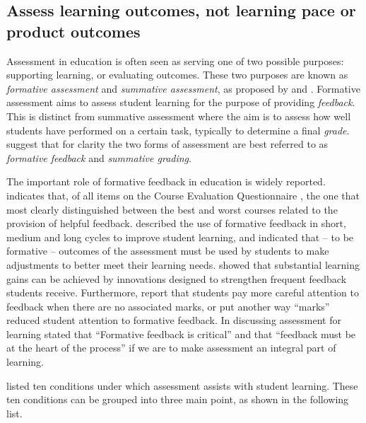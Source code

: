 

\subsection{Assess learning outcomes, not learning pace or product outcomes} %
\label{ssub:aim_to_assess_learning_outcomes_not_learning_pace_or_product_outcomes_}

Assessment in education is often seen as serving one of two possible purposes: supporting learning, or evaluating outcomes. These two purposes are known as \emph{formative assessment} and \emph{summative assessment}, as proposed by \citet{Scriven:1967} and \citet{Bloom:1969}. Formative assessment aims to assess student learning for the purpose of providing \emph{feedback}. This is distinct from summative assessment where the aim is to assess how well students have performed on a certain task, typically to determine a final \emph{grade}. \citet{Biggs:2007} suggest that for clarity the two forms of assessment are best referred to as \emph{formative feedback} and \emph{summative grading}.

The important role of formative feedback in education is widely reported. \citet{Ramsden:1992} indicates that, of all items on the Course Evaluation Questionnaire \cite{Ramsden:1991}, the one that most clearly distinguished between the best and worst courses related to the provision of helpful feedback. \citet{William:2006} described the use of formative feedback in short, medium and long cycles to improve student learning, and indicated that -- to be formative -- outcomes of the assessment must be used by students to make adjustments to better meet their learning needs. \citet{Black:1998} showed that substantial learning gains can be achieved by innovations designed to strengthen frequent feedback students receive. Furthermore, \citet{Black:1998} report that students pay more careful attention to feedback when there are no associated marks, or put another way ``marks'' reduced student attention to formative feedback. In discussing assessment for learning \citet{Brown:2004} stated that ``Formative feedback is critical'' and that ``feedback must be at the heart of the process'' if we are to make assessment an integral part of learning. 

\citet{Gibbs:2004} listed ten conditions under which assessment assists with student learning. These ten conditions can be grouped into three main point, as shown in the following list.

